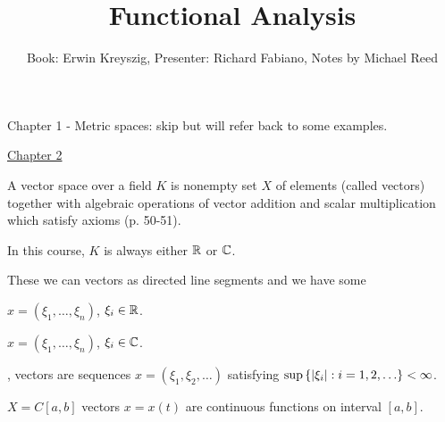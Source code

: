 \documentclass[]{article}
\author{Book: Erwin Kreyszig, Presenter: Richard Fabiano, Notes by Michael Reed}
\title{Functional Analysis}
\begin{document}
\maketitle


Chapter 1 - Metric spaces:
skip but will refer back to some examples.

\ul{Chapter 2}

\begin{definition}
	A vector space over a field $K$ is nonempty set $X$ of elements (called vectors) together with algebraic operations of vector addition and scalar multiplication which satisfy axioms (p. 50-51).
\end{definition}
\begin{note}
	In this course, $K$ is always either $\mathbb{R}$ or $\mathbb{C}$.
\end{note}
\begin{example}
	[$\mb R^2$ and $\mb R^3$] These we can  vectors as directed line segments and we have some 
\end{example}
\begin{example}
	[$X = \mb R^n$] $x = (\xi_1,\dots,\xi_n)$, $\xi_i\in\mathbb{R}$.
\end{example}
\begin{example}
	[$X=\mb C^n$] $x = (\xi_1,\dots,\xi_n)$, $\xi_i\in\mathbb{C}$.
\end{example}
\begin{example}
	[$X=\ell^\infty$] , vectors are sequences $x=(\xi_1,\xi_2,\dots)$ satisfying $\sup\setc{|\xi_i|}{i=1,2,\dots}<\infty$.
\end{example}
\begin{example}
	$X = C[a,b]$ vectors $x=x(t)$ are continuous functions on interval $[a,b]$.
\end{example}
\end{document}
